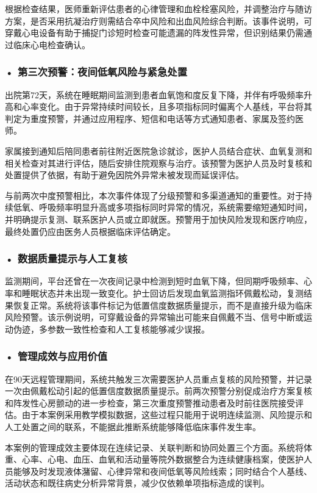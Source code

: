 根据检查结果，医师重新评估患者的心律管理和血栓栓塞风险，并调整治疗与随访方案，是否采用抗凝治疗则需结合卒中风险和出血风险综合判断。该事件说明，可穿戴心电设备有助于捕捉门诊短时检查可能遗漏的阵发性异常，但识别结果仍需通过临床心电检查确认。

\subsubsection*{\textbf{• 第三次预警：夜间低氧风险与紧急处置}}

出院第72天，系统在睡眠期间监测到患者血氧饱和度反复下降，并伴有呼吸频率升高和心率变化。由于异常持续时间较长，且多项指标同时偏离个人基线，平台将其判定为重度预警，并通过应用程序、短信和电话等方式通知患者、家属及签约医师。

家属接到通知后陪同患者前往附近医院急诊就诊，医护人员结合症状、血氧复测和相关检查对其进行评估，随后安排住院观察与治疗。该预警为医护人员及时复核和处置提供了依据，有助于避免因院外异常未被发现而延误评估。

与前两次中度预警相比，本次事件体现了分级预警和多渠道通知的重要性。对于持续低氧、呼吸频率明显升高或多项指标同时异常的情况，系统需要缩短通知时间，并明确提示复测、联系医护人员或立即就医。预警用于加快风险发现和医疗响应，最终处置仍应由医务人员根据临床评估确定。
\subsubsection*{\textbf{• 数据质量提示与人工复核}}

监测期间，平台还曾在一次夜间记录中检测到短时血氧下降，但同期呼吸频率、心率和睡眠状态并未出现一致变化。护士回访后发现血氧监测指环佩戴松动，复测结果恢复正常。系统将该事件标记为低置信度数据质量提示，而不是直接升级为临床风险预警。该示例说明，可穿戴设备的异常输出可能来自佩戴不当、信号中断或运动伪迹，多参数一致性检查和人工复核能够减少误报。

\subsubsection*{\textbf{• 管理成效与应用价值}}

在90天远程管理期间，系统共触发三次需要医护人员重点复核的风险预警，并记录一次由佩戴松动引起的低置信度数据质量提示。前两次预警分别促成治疗方案复核和阵发性心房颤动的进一步检查，第三次重度预警推动患者及时前往医院接受评估。由于本案例采用教学模拟数据，这些过程只能用于说明连续监测、风险提示和人工处置之间的联系，不能据此推断系统能够降低临床事件发生率。

本案例的管理成效主要体现在连续记录、关联判断和协同处置三个方面。系统将体重、心率、心电、血压、血氧和活动量等院外数据整合为连续健康档案，使医护人员能够及时发现液体潴留、心律异常和夜间低氧等风险线索；同时结合个人基线、活动状态和既往病史分析异常背景，减少仅依赖单项指标造成的误判。

